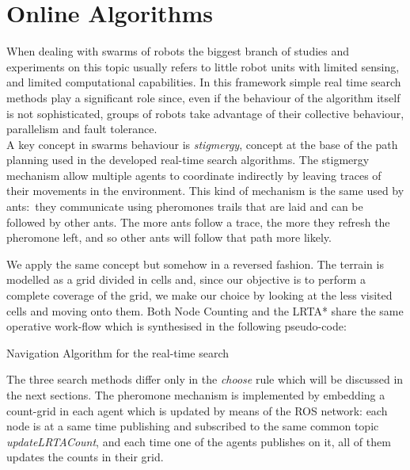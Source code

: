 \chapter{Online Algorithms}

When dealing with swarms of robots the biggest branch of studies and experiments on this topic usually refers to little robot units with limited sensing, and limited computational capabilities. In this framework simple real time search methods play a significant role since, even if the behaviour of the algorithm itself is not sophisticated, groups of robots take advantage of their collective behaviour, parallelism and fault tolerance. \\
A key concept in swarms behaviour is \emph{stigmergy}, concept at the base of the path planning used in the developed real-time search algorithms.  The stigmergy mechanism allow multiple agents to coordinate indirectly by leaving traces of their movements in the environment. This kind of mechanism is the same used by ants:~they communicate using pheromones trails that are laid and can be followed by other ants. The more ants follow a trace, the more they refresh the pheromone left, and so other ants will follow that path more likely.

We apply the same concept but somehow in a reversed fashion. The terrain is modelled as a grid divided in cells and, since our objective is to perform a complete coverage of the grid, we make our choice by looking at the less visited cells and moving onto them. Both Node Counting and the LRTA* share the same operative work-flow which is synthesised in the following pseudo-code:

\begin{algorithm}
\caption{Navigation Algorithm for the real-time search}
\label{alg:rt_gen}
\begin{algorithmic} [1]
 \label{a:init_v}
 \label{a:initU_rt}
\label{a:bigWhile_rt}
\ENDWHILE
\end{algorithmic}
\end{algorithm}

The three search methods differ only in the \emph{choose} rule which will be discussed in the next sections. The pheromone mechanism is implemented by embedding a count-grid in each agent which is updated by means of the ROS network: each node is at a same time publishing and subscribed to the same common topic  \textit{updateLRTACount}, and each time one of the agents publishes on it, all of them updates the counts in their grid.

